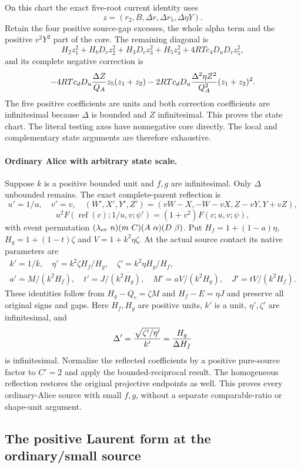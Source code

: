 On this chart the exact five-root current identity uses
\[
 z=(r_2,B,\Delta r,\Delta r_5,\Delta\eta Y).
\]
Retain the four positive source-gap excesses, the whole alpha term
and the positive $v^2Y^2$ part of the core. The remaining diagonal is
\[
 H_2z_1^2+H_bD_vz_2^2+H_3D_vz_3^2+H_5z_4^2
                       +4RTc_4D_uD_vz_5^2,
\]
and its complete negative correction is
\[
 -4RTc_dD_u{\Delta Z\over Q_A}z_5(z_1+z_2)
 -2RTc_dD_u{\Delta^2\eta Z^2\over Q_A^2}(z_1+z_2)^2.
\]
The five positive coefficients are units and both correction
coefficients are infinitesimal because $\Delta$ is bounded and
$Z$ infinitesimal. This proves the state chart. The literal testing
axes have nonnegative core directly. The local and complementary
state arguments are therefore exhaustive.

\paragraph{Ordinary Alice with arbitrary state scale.}
Suppose $k$ is a positive bounded unit and $f,g$ are infinitesimal.
Only $\Delta$ unbounded remains. The exact complete-parent reflection
is
\[
 u'=1/u,\quad v'=v,\quad
 (W',X',Y',Z')=(vW-X,-W-vX,Z-vY,Y+vZ),\tag{AS3}
\]
\[
 u^2F(\operatorname{ref}(c);1/u,v;\psi')
                         =(1+v^2)F(c;u,v;\psi),\tag{AS4}
\]
with event permutation $(\lambda_{\rm ev}\ n)(m\ C)(A\ \alpha)
(D\ \beta)$. Put $H_f=1+(1-a)\eta$, $H_g=1+(1-t)\zeta$
and $V=1+k^2\eta\zeta$. At the actual source contact its native
parameters are
\[
\begin{gathered}
 k'=1/k,\quad
 \eta'=k^2\zeta H_f/H_g,\quad\zeta'=k^2\eta H_g/H_f,\\
 a'=M/(k^2H_f),\quad t'=J/(k^2H_g),\quad
 M'=aV/(k^2H_g),\quad J'=tV/(k^2H_f).
\end{gathered}\tag{AS5}
\]
These identities follow from $H_g-Q_c=\zeta M$ and
$H_f-E=\eta J$ and preserve all original signs and gaps.
Here $H_f,H_g$ are positive units, $k'$ is a unit,
$\eta',\zeta'$ are infinitesimal, and
\[
 \Delta'={\sqrt{\zeta'/\eta'}\over k'}
                         ={H_g\over\Delta H_f}
\]
is infinitesimal. Normalize the reflected coefficients by a positive
pure-source factor to $C'=2$ and apply the bounded-reciprocal result.
The homogeneous reflection restores the original projective endpoints
as well. This proves every ordinary-Alice source with small $f,g$,
without a separate comparable-ratio or shape-unit argument.


\subsection{The positive Laurent form at the ordinary/small source}

